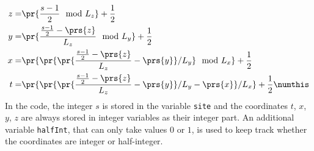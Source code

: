 \begin{align*}
    z =& \pr{\frac{s-1}{2} \mod L_z} + \frac12 \\
    y =& \pr{\frac{\frac{s-1}{2} - \prs{z}}{L_z} \mod L_y} + \frac12 \\
    x =& \pr{\pr{\pr{\frac{\frac{s-1}{2} - \prs{z}}{L_z} - \prs{y}}/L_y} \mod L_x} + \frac12 \\
    t =& \pr{\pr{\pr{\frac{\frac{s-1}{2} - \prs{z}}{L_z} - \prs{y}}/L_y - \prs{x}}/L_x} + \frac12 \numthis\label{4:siteIndexBCToddInverted}
\end{align*}
In the code, the integer $s$ is stored in the variable \texttt{site} and the coordinates $t$, $x$, $y$, $z$ are always stored in integer variables as their integer part.
An additional variable \texttt{halfInt}, that can only take values $0$ or $1$, is used to keep track whether the coordinates are integer or half-integer.


